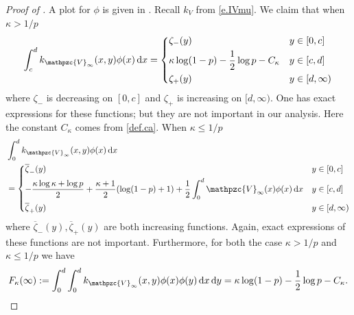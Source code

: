 \documentclass[reqno,11pt]{amsart}
\numberwithin{equation}{section}
\theoremstyle{definition}
\newcommand*\diff{\mathop{}\!\mathrm{d}}
\begin{document}
\begin{proof}[Proof of ]
A plot for $\phi$ is given in . Recall $k_V$ from \eqref{e.IVmu}. We claim that when $\kappa > 1/p$
\begin{align}\label{intb}
    \int_c^d k_{\mathpzc{V}_\infty}(x,y)\phi(x)\diff x  = \begin{dcases}
        \zeta_-(y) & y\in [0,c] \\
        \kappa \log(1-p)-\frac12\log p-C_\kappa & y\in [c,d] \\
       \zeta_+(y)  & y\in [d,\infty)
    \end{dcases}
\end{align} 
where $\zeta_-$ is decreasing on $[0,c]$ and $\zeta_+$ is increasing on $[d,\infty)$. One has exact expressions for these functions; but they are not important in our analysis. Here the constant $C_\kappa$ comes from \eqref{def.ca}. When $\kappa \le 1/p$
\begin{equation}
\begin{aligned}\label{inta}
    &\int_0^d k_{\mathpzc{V}_\infty}(x,y)\phi(x)\diff x  \\
    &= \begin{dcases} \overline\zeta_-(y)
         & y\in [0,c] \\
    -\frac{\kappa\log \kappa+\log p}{2}+\frac{\kappa+1}{2}(\log(1-p)+1)+\frac{1}{2}\int_0^d \mathpzc{V}_\infty(x)\phi(x)\diff x    & y\in [c,d] \\
      \overline\zeta_+(y)   & y\in [d,\infty)
    \end{dcases}
\end{aligned}
\end{equation}
where $\overline\zeta_-(y), \overline\zeta_+(y)$ are both increasing functions. Again, exact expressions of these functions are not important.  Furthermore, for both the case $\kappa>1/p$ and $\kappa \leq 1/p$
we have
\begin{align}\label{intc}
    F_\kappa(\infty):= \int_0^d \int_0^d k_{\mathpzc{V}_\infty}(x,y)\phi(x)\phi(y)\diff x \diff y=\kappa \log (1-p)-\frac12\log p-C_\kappa.
\end{align}


\end{proof}
\end{document}
